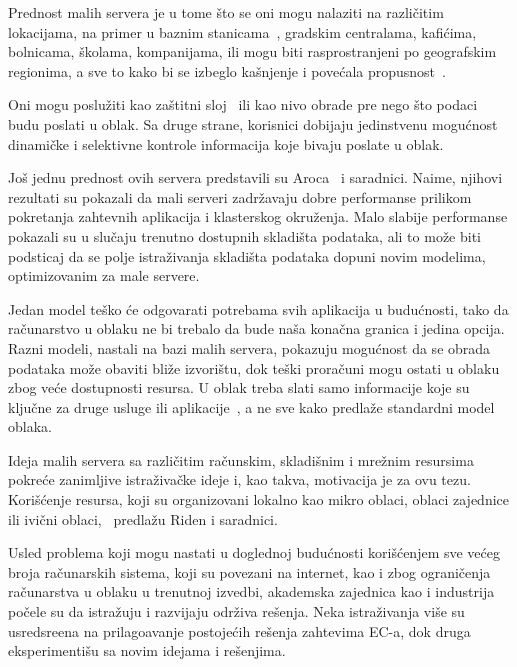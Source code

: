 Prednost malih servera je u tome \v sto se oni mogu nalaziti na razli\v citim lokacijama, na primer u baznim stanicama~\cite{WangZZWYW17}, gradskim centralama, kafi\'cima, bolnicama, \v skolama, kompanijama, ili mogu biti rasprostranjeni po geografskim regionima, a sve to kako bi se izbeglo ka\v snjenje i pove\'cala propusnost~\cite{MonsalveCC18}.   

Oni mogu poslu\v ziti kao za\v stitni sloj~\cite{SatyanarayananK19} ili kao nivo obrade pre nego \v sto podaci budu poslati u oblak. Sa druge strane, korisnici dobijaju jedinstvenu mogu\'cnost dinami\v cke i selektivne kontrole informacija koje bivaju poslate u oblak. 

Jo\v s jednu prednost ovih servera predstavili su Aroca~\cite{ArocaG12} i saradnici. Naime, njihovi rezultati su pokazali da mali serveri zadr\v zavaju dobre performanse prilikom pokretanja zahtevnih aplikacija i klasterskog okru\v zenja. Malo slabije performanse pokazali su u slu\v caju trenutno dostupnih skladi\v sta podataka, ali to mo\v ze biti podsticaj da se polje istra\v zivanja skladi\v sta podataka dopuni novim modelima, optimizovanim za male servere.

Jedan model te\v sko \'ce odgovarati potrebama svih aplikacija u budu\'cnosti, tako da ra\v cunarstvo u oblaku ne bi trebalo da bude na\v sa kona\v cna granica i jedina opcija. Razni modeli, nastali na bazi malih servera, pokazuju mogu\'cnost da se obrada podataka mo\v ze obaviti bli\v ze izvori\v stu, dok te\v ski prora\v cuni mogu ostati u oblaku zbog ve\'ce dostupnosti resursa. U oblak treba slati samo informacije koje su klju\v cne za druge usluge ili aplikacije~\cite{inproceedingsSimic1}, a ne sve kako predla\v ze standardni model oblaka. 

Ideja malih servera sa razli\v citim ra\v cunskim, skladi\v snim i mre\v znim resursima pokre\'ce zanimljive istra\v ziva\v cke ideje i, kao takva, motivacija je za ovu tezu. Kori\v s\'cenje resursa, koji su organizovani lokalno kao mikro oblaci, oblaci zajednice ili ivi\v cni oblaci,~\cite{RydenOCW14} predla\v zu Riden i saradnici.

Usled problema koji mogu nastati u doglednoj budu\'cnosti kori\v s\'cenjem sve ve\'ceg broja ra\v cunarskih sistema, koji su povezani na internet, kao i  zbog ograni\v cenja ra\v cunarstva u oblaku u trenutnoj izvedbi, akademska zajednica kao i industrija po\v cele su da istra\v zuju i razvijaju odr\v ziva re\v senja. Neka istra\v zivanja vi\v se su usredsre\dj ena na prilago\dj avanje postoje\'cih re\v senja zahtevima EC-a, dok druga eksperimenti\v su sa novim idejama i re\v senjima.

